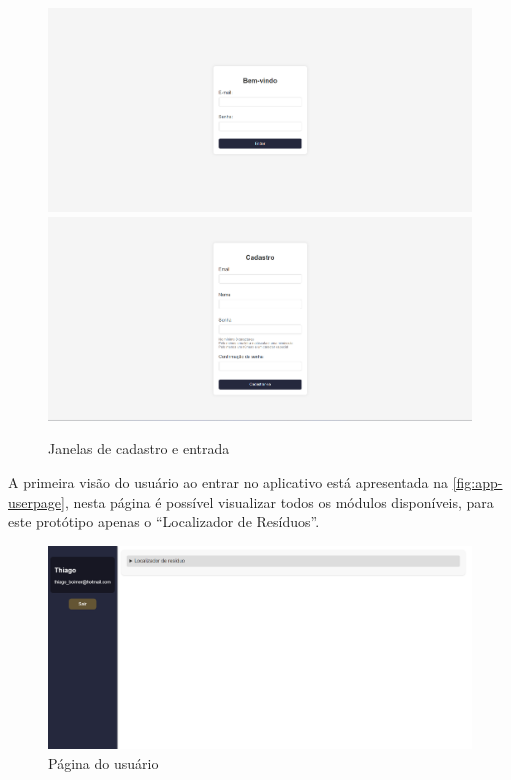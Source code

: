 \begin{figure}[H]
	\caption{\label{fig:app-logsign} Janelas de cadastro e entrada}
	\begin{center}
		\includegraphics[scale=0.38]{images/entrar.png}
    \includegraphics[scale=0.38]{images/cadasto.png}
	\end{center}
\end{figure}

A primeira visão do usuário ao entrar no aplicativo está apresentada na \autoref{fig:app-userpage}, nesta página é possível visualizar todos os módulos disponíveis, para este protótipo apenas o “Localizador de Resíduos”.

\begin{figure}[H]
	\caption{\label{fig:app-userpage} Página do usuário}
	\begin{center}
		\includegraphics[scale=0.38]{images/user-page.png}
	\end{center}
\end{figure}

